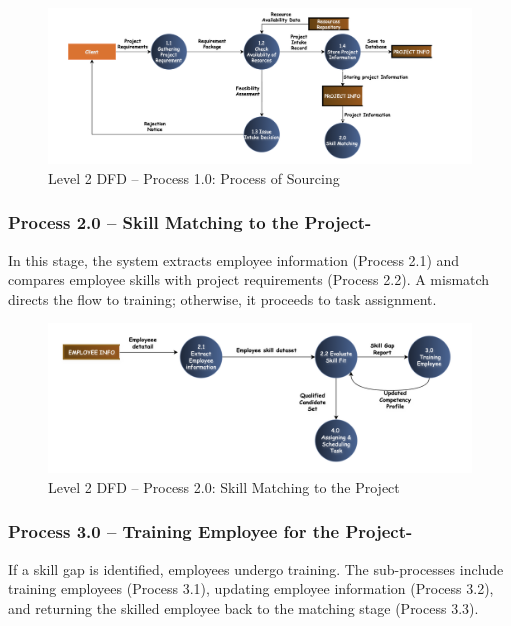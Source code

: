 \documentclass[12pt,a4paper]{article}
\begin{document}
\begin{figure}[H]
    \centering
    \includegraphics[width=\textwidth]{Fig/process1_dfd.png}
    \caption{Level 2 DFD – Process 1.0: Process of Sourcing}
    \label{fig:level2_process1}
\end{figure}

\newpage
\subsubsection*{Process 2.0 – Skill Matching to the Project-}
\noindent
In this stage, the system extracts employee information (Process 2.1) and compares employee skills with project requirements (Process 2.2). A mismatch directs the flow to training; otherwise, it proceeds to task assignment.

\begin{figure}[H]
    \centering
    \includegraphics[width=\textwidth]{Fig/process2_dfd.png}
    \caption{Level 2 DFD – Process 2.0: Skill Matching to the Project}
    \label{fig:level2_process2}
\end{figure}

\vspace{1.8cm}
\subsubsection*{Process 3.0 – Training Employee for the Project-}
\noindent
If a skill gap is identified, employees undergo training. The sub-processes include training employees (Process 3.1), updating employee information (Process 3.2), and returning the skilled employee back to the matching stage (Process 3.3).
\end{document}
